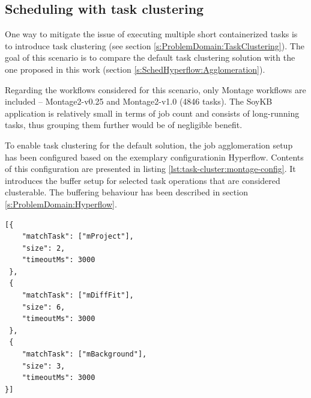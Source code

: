 \subsection{Scheduling with task clustering}\label{s:Evaluation:Agglomeration}

One way to mitigate the issue of executing multiple short containerized tasks is to introduce task clustering (see section \ref{s:ProblemDomain:TaskClustering}).
The goal of this scenario is to compare the default task clustering solution with the one proposed in this work (section \ref{s:SchedHyperflow:Agglomeration}).

Regarding the workflows considered for this scenario, only Montage workflows are included -- Montage2-v0.25 and Montage2-v1.0 (4846 tasks).
The SoyKB application is relatively small in terms of job count and consists of long-running tasks, thus grouping them further would be of negligible benefit.

To enable task clustering for the default solution, the job agglomeration setup has been configured based on the exemplary configuration\footnotemark[1] in Hyperflow.
Contents of this configuration are presented in listing \ref{lst:task-cluster:montage-config}.
It introduces the buffer setup for selected task operations that are considered clusterable.
The buffering behaviour has been described in section \ref{s:ProblemDomain:Hyperflow}.



\smallskip
\begin{center}
\begin{minipage}{0.6\textwidth}
\centering
\begin{lstlisting}[basicstyle=\fontsize{9}{10}\selectfont]
[{
    "matchTask": ["mProject"],
    "size": 2,
    "timeoutMs": 3000
 },
 {
    "matchTask": ["mDiffFit"],
    "size": 6,
    "timeoutMs": 3000
 },
 {
    "matchTask": ["mBackground"],
    "size": 3,
    "timeoutMs": 3000
}]
\end{lstlisting}
\label{lst:task-cluster:montage-config}
\end{minipage}
\end{center}



